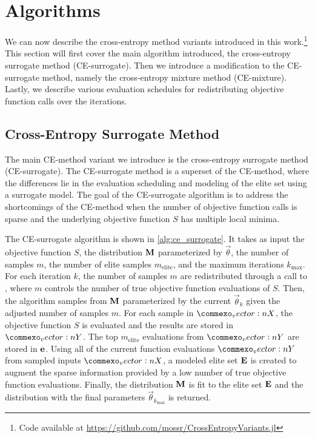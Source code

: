 \section{Algorithms} \label{sec:algorithms}
We can now describe the cross-entropy method variants introduced in this work.\footnote{Code available at \href{https://github.com/mossr/CrossEntropyVariants.jl}{https://github.com/mossr/CrossEntropyVariants.jl}}
This section will first cover the main algorithm introduced, the cross-entropy surrogate method (CE-surrogate).
Then we introduce a modification to the CE-surrogate method, namely the cross-entropy mixture method (CE-mixture).
Lastly, we describe various evaluation schedules for redistributing objective function calls over the iterations.

\subsection{Cross-Entropy Surrogate Method} \label{sec:alg_ce_surrogate}
The main CE-method variant we introduce is the cross-entropy surrogate method (CE-surrogate).
The CE-surrogate method is a superset of the CE-method, where the differences lie in the evaluation scheduling and modeling of the elite set using a surrogate model.
The goal of the CE-surrogate algorithm is to address the shortcomings of the CE-method when the number of objective function calls is sparse and the underlying objective function $S$ has multiple local minima.

The CE-surrogate algorithm is shown in \cref{alg:ce_surrogate}.
It takes as input the objective function $S$, the distribution $\mathbf{M}$ parameterized by $\vec{\theta}$, the number of samples $m$, the number of elite samples $m_\text{elite}$, and the maximum iterations $k_\text{max}$.
For each iteration $k$, the number of samples $m$ are redistributed through a call to , where $m$ controls the number of true objective function evaluations of $S$. %
Then, the algorithm samples from $\mathbf{M}$ parameterized by the current $\vec{\theta}_k$ given the adjusted number of samples $m$. %
For each sample in $\mat{X}$, the objective function $S$ is evaluated and the results are stored in $\mat{Y}$.
The top $m_\text{elite}$ evaluations from $\mat{Y}$ are stored in $\mathbf{e}$. 
Using all of the current function evaluations $\mat{Y}$ from sampled inputs $\mat{X}$, a modeled elite set $\mathbf{E}$ is created to augment the sparse information provided by a low number of true objective function evaluations.
Finally, the distribution $\mathbf{M}$ is fit to the elite set $\mathbf{E}$ and the distribution with the final parameters $\vec{\theta}_{k_\text{max}}$ is returned.

